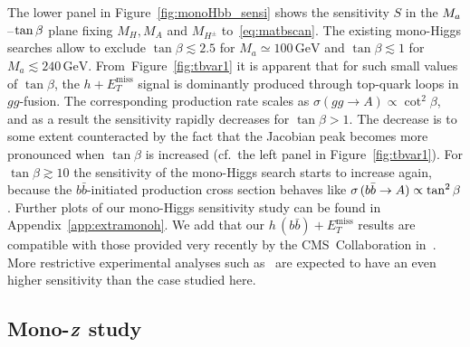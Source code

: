 \documentclass[review]{elsarticle}
\newcommand{\MET}{\ensuremath{E_T^\mathrm{miss}}\xspace}
\newcommand{\mA}{\ensuremath{M_{A}}\xspace}
\newcommand{\ma}{\ensuremath{M_{a}}\xspace}
\newcommand{\mH}{\ensuremath{M_{H}}\xspace}
\newcommand{\mHc}{\ensuremath{M_{H^{\pm}}}\xspace}
\def\bm#1{\mbox{\boldmath$#1$\unboldmath}}
\begin{document}
The lower panel in Figure~\ref{fig:monoHbb_sensi} shows the sensitivity $S$ in the $\ma\hspace{0.25mm}$--$\hspace{0.25mm}\tan \beta$ plane fixing  $\mH, \mA$ and  $\mHc$ to~\eqref{eq:matbscan}. The existing mono-Higgs searches allow to exclude $\tan \beta \lesssim 2.5$ for $M_a \simeq 100 \, {\mathrm{GeV}}$ and $\tan \beta \lesssim 1$ for $M_a \lesssim 240 \, {\mathrm{GeV}}$. From~Figure~\ref{fig:tbvar1} it is apparent that for such small values of $\tan \beta$, the $h + \MET$ signal is dominantly produced through top-quark loops in $gg$-fusion. The corresponding production rate scales as $\sigma \left ( gg \to A \right ) \propto \cot^2 \beta$, and as a result the sensitivity rapidly decreases for $\tan \beta > 1$. The decrease is to some extent counteracted by the fact that the Jacobian peak becomes more pronounced when  $\tan \beta$ is increased (cf.~the left panel in Figure~\ref{fig:tbvar1}). For $\tan \beta \gtrsim 10$ the sensitivity of the mono-Higgs search  starts to increase again, because the $b \bar b$-initiated production cross section behaves like $\sigma \hspace{0.5mm} ( b \bar b \to A  ) \propto \tan^2 \beta$. Further plots of our mono-Higgs sensitivity study can be found in Appendix~\ref{app:extramonoh}.  We add that our $h \, (b \bar b) + \MET$ results are compatible with those provided very recently by the CMS~Collaboration in~\cite{Sirunyan:2018gdw}. More restrictive experimental analyses such as~\cite{Sirunyan:2018qob} are expected to have an even higher sensitivity than the case  studied here. 

\subsection[Mono-$Z$ study]{Mono-$\bm{Z}$ study}
\label{sec:sensi_monozll}
\end{document}
